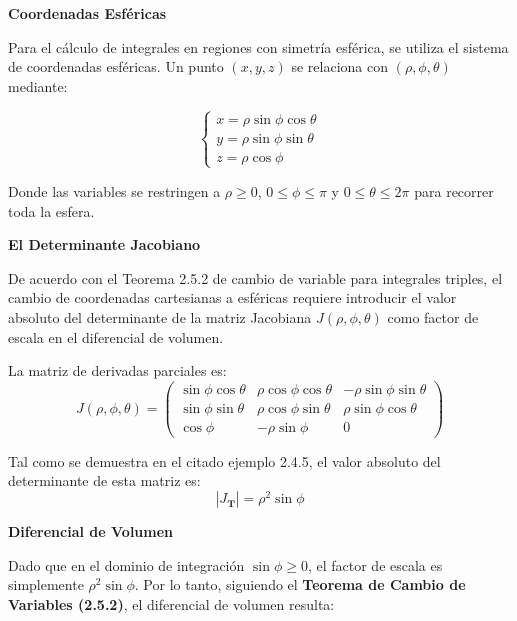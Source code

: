 \noindent\textbf{Coordenadas Esféricas}
\vspace{0.2cm}

Para el cálculo de integrales en regiones con simetría esférica, se utiliza el sistema de coordenadas esféricas. Un punto $(x, y, z)$ se relaciona con $(\rho, \phi, \theta)$ mediante:

\begin{equation}
    \begin{cases}
        x = \rho \sin \phi \cos \theta \\
        y = \rho \sin \phi \sin \theta \\
        z = \rho \cos \phi
    \end{cases}
\end{equation}

Donde las variables se restringen a $\rho \ge 0$, $0 \le \phi \le \pi$ y $0 \le \theta \le 2\pi$ para recorrer toda la esfera.

\vspace{0.4cm}
\noindent\textbf{El Determinante Jacobiano}

De acuerdo con el Teorema 2.5.2 de cambio de variable para integrales triples, el cambio de coordenadas cartesianas a esféricas requiere introducir el valor absoluto del determinante de la matriz Jacobiana $J(\rho, \phi, \theta)$ como factor de escala en el diferencial de volumen.

La matriz de derivadas parciales es:
\begin{equation}
J(\rho, \phi, \theta) = 
\begin{pmatrix}
\sin \phi \cos \theta & \rho \cos \phi \cos \theta & -\rho \sin \phi \sin \theta \\
\sin \phi \sin \theta & \rho \cos \phi \sin \theta & \rho \sin \phi \cos \theta \\
\cos \phi & -\rho \sin \phi & 0
\end{pmatrix}
\end{equation}

Tal como se demuestra en el citado ejemplo 2.4.5, el valor absoluto del determinante de esta matriz es:
\begin{equation}
    \left| J_{\mathbf{T}} \right| = \rho^2 \sin \phi
\end{equation}

\vspace{0.4cm}
\noindent\textbf{Diferencial de Volumen}

Dado que en el dominio de integración $\sin \phi \ge 0$, el factor de escala es simplemente $\rho^2 \sin \phi$. Por lo tanto, siguiendo el \textbf{Teorema de Cambio de Variables (2.5.2)}, el diferencial de volumen resulta:

